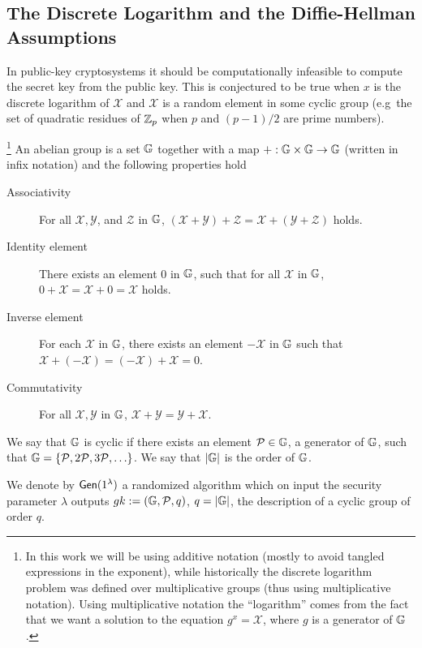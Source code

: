 \subsection{The Discrete Logarithm and the Diffie-Hellman Assumptions}
In public-key cryptosystems it should be computationally infeasible to compute the secret key from the public key.
This is conjectured to be true when $x$ is the {discrete logarithm} of $\mathcal{X}$ and $\mathcal{X}$ is a random element in some cyclic group (e.g~the set of quadratic residues of $\mathbb{Z}_p$ when $p$ and $(p-1)/2$ are prime numbers).
\begin{definition}\footnote{In this work we will be using additive notation (mostly to avoid tangled expressions in the exponent), while historically the discrete logarithm problem was defined over multiplicative groups (thus using multiplicative notation). Using multiplicative notation the ``logarithm'' comes from the fact that we want a solution to the equation $g^x=\mathcal{X}$, where $g$ is a generator of $\mathbb{G}$.} 
An abelian group is a set $\mathbb{G}$ together with a map $+:\mathbb{G}\times\mathbb{G}\to\mathbb{G}$ (written in infix notation) and  the following properties hold
\begin{description}
\item[Associativity]
For all $\mathcal{X}, \mathcal{Y}$, and $\mathcal{Z}$ in $\mathbb{G}$, $(\mathcal{X} + \mathcal{Y}) + \mathcal{Z}= \mathcal{X} + (\mathcal{Y} + \mathcal{Z})$ holds.
\item[Identity element]
There exists an element $0$ in $\mathbb{G}$, such that for all $\mathcal{X}$ in $\mathbb{G}$, $0 + \mathcal{X} = \mathcal{X} + 0 = \mathcal{X}$ holds.
\item[Inverse element]
For each $\mathcal{X}$ in $\mathbb{G}$, there exists an element $-\mathcal{X}$ in $\mathbb{G}$ such that $\mathcal{X}+ (-\mathcal{X}) = (-\mathcal{X}) +\mathcal{X} = 0$.
\item[Commutativity]
For all $\mathcal{X}, \mathcal{Y}$ in $\mathbb{G}$, $\mathcal{X} + \mathcal{Y}=\mathcal{Y}+\mathcal{X}$.
\end{description}
We say that $\mathbb{G}$ is cyclic if there exists an element $\mathcal{P}\in\mathbb{G}$, a generator of $\mathbb{G}$, such that $\mathbb{G}=\{\mathcal{P}, 2\mathcal{P}, 3\mathcal{P},\ldots\}$. We say that $|\mathbb{G}|$ is the order of $\mathbb{G}$.

We denote by $\mathsf{Gen}(1^\lambda)$ a randomized algorithm which on input the security parameter $\lambda$ outputs $gk:=(\mathbb{G},\mathcal{P},q)$, $q=|\mathbb{G}|$, the description of a cyclic group of order $q$.
\end{definition}

